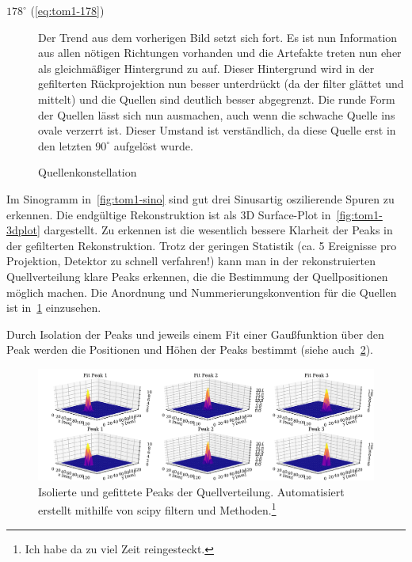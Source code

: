 \documentclass[slug=PET, room=Andreas-Schubert-Bau\,\ 424A,
supervisor=Carsten\ Bittrich, coursedate=10.\ 01.\ 2020, ngerman]{../../Lab_Report_LaTeX/lab_report}
\begin{document}
\begin{description}
\item[\(178^\circ\) (\eqref{eq:tom1-178})] Der Trend aus dem vorherigen
  Bild setzt sich fort. Es ist nun Information aus allen n\"otigen
  Richtungen vorhanden und die Artefakte treten nun eher als
  gleichm\"a\ss{}iger Hintergrund zu auf. Dieser Hintergrund wird in
  der gefilterten Rückprojektion nun besser unterdr\"uckt (da der filter gl\"attet
  und mittelt) und die Quellen sind deutlich besser abgegrenzt. Die
  runde Form der Quellen l\"asst sich nun ausmachen, auch wenn die
  schwache Quelle ins ovale verzerrt ist. Dieser Umstand ist
  verst\"andlich, da diese Quelle erst in den letzten \(90^\circ\)
  aufgel\"ost wurde.
\end{description}

\begin{figure}
 \centering
 \caption[Quellenkonstellation]{Quellenkonstellation}
 \label{fig:sourccof}
\end{figure}

Im Sinogramm in~\ref{fig:tom1-sino} sind gut drei Sinusartig
oszilierende Spuren zu erkennen.  Die endg\"ultige Rekonstruktion ist
als 3D Surface-Plot in~\ref{fig:tom1-3dplot} dargestellt. Zu erkennen
ist die wesentlich bessere Klarheit der Peaks in der gefilterten
Rekonstruktion. Trotz der geringen Statistik (ca. 5 Ereignisse pro
Projektion, Detektor zu schnell verfahren!)  kann man in der
rekonstruierten Quellverteilung klare Peaks erkennen, die die
Bestimmung der Quellpositionen m\"oglich machen. Die Anordnung und
Nummerierungskonvention f\"ur die Quellen ist in~\ref{fig:sourccof}
einzusehen.

Durch Isolation der Peaks und jeweils einem Fit einer Gaußfunktion
\"uber den Peak werden die Positionen und H\"ohen der Peaks bestimmt
(siehe auch~\ref{fig:tom1-filtered_fit}).

\begin{figure}[h]\centering
  \includegraphics[width=\textwidth]{../auswertung/figs/tom1/filtered_fit.pdf}
  \caption[Fit der Peaks]{Isolierte und gefittete Peaks der
    Quellverteilung. Automatisiert erstellt mithilfe von scipy
    filtern und Methoden.\footnote{Ich habe da zu viel Zeit reingesteckt.}}
  \label{fig:tom1-filtered_fit}
\end{figure}
\end{document}
